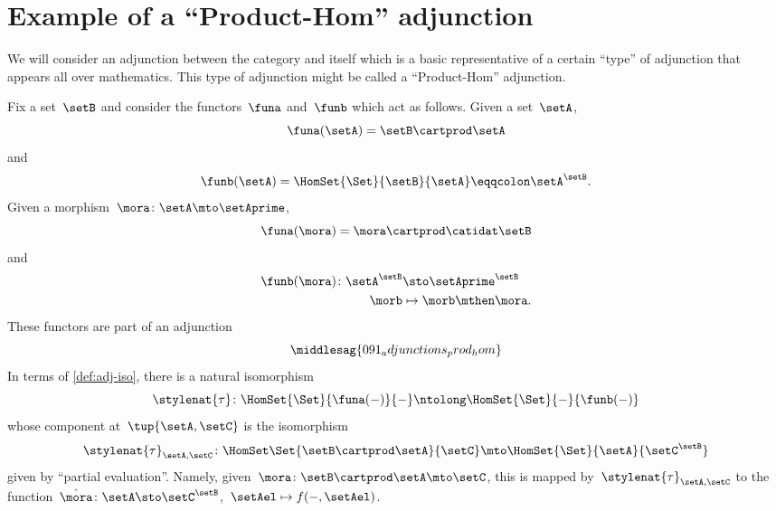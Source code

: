 
\section[Product-Hom adjunction]{Example of a ``Product-Hom'' adjunction}
We will consider an adjunction between the category \Set and itself which is a basic representative of a certain ``type'' of adjunction that appears all over mathematics.
This type of adjunction might be called a ``Product-Hom'' adjunction.

Fix a set~$\setB$ and consider the functors~$\funa$ and~$\funb$ which act as follows.
Given a set~$\setA$,
\begin{equation}
    \funa(\setA) = \setB \cartprod \setA
\end{equation}
and
\begin{equation}
    \funb(\setA) = \HomSet{\Set}{\setB}{\setA} \eqqcolon \setA^\setB.
\end{equation}
Given a morphism~$\mora\colon \setA \mto \setAprime$,
\begin{equation}
    \funa(\mora) = \mora \cartprod \catidat\setB
\end{equation}
and
\begin{equation}
    \begin{aligned}
        \funb(\mora)\colon \setA^\setB & \sto \setAprime^\setB \\
        \morb                          & \mapsto \morb \mthen \mora.
    \end{aligned}
\end{equation}
%
These functors are part of an adjunction
%
\begin{equation}
    \middlesag{091_adjunctions_prod_hom}
\end{equation}
In terms of \cref{def:adj-iso}, there is a natural isomorphism
\begin{equation}
    \stylenat{\tau}\colon \HomSet{\Set}{\funa(- )}{-}  \ntolong   \HomSet{\Set}{-}{\funb( - )}
\end{equation}
whose component at~$\tup{\setA,\setC}$ is the isomorphism
\begin{equation}
    \stylenat{\tau}_{\setA,\setC} \colon \HomSet\Set{\setB\cartprod \setA}{\setC} \mto \HomSet{\Set}{\setA}{\setC^\setB}
\end{equation}
given by ``partial evaluation''.
Namely, given~$\mora \colon \setB \cartprod \setA \mto \setC$, this is mapped by~$\stylenat{\tau}_{\setA,\setC}$ to the function~$\hat \mora \colon \setA \sto \setC^\setB$,~$\setAel \mapsto f( -, \setAel)$.

